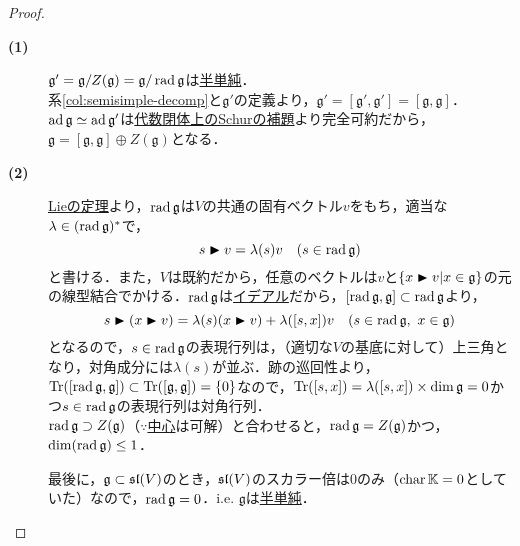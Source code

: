 \documentclass[rep_main]{subfiles}
\begin{document}
\begin{proof}
	\begin{description}
		\item[\textbf{(1)}] $\mathfrak{g}' = \mathfrak{g} / Z(\mathfrak{g}) = \mathfrak{g} / \operatorname{rad}\mathfrak{g}$は\hyperref[def:semisimple-LieAlg]{半単純}．\\
		系\ref{col:semisimple-decomp}と$\mathfrak{g}'$の定義より，$\mathfrak{g}' = [\mathfrak{g}', \mathfrak{g}'] = [\mathfrak{g}, \mathfrak{g}]$．\\
		$\operatorname{ad}\mathfrak{g} \simeq \operatorname{ad} \mathfrak{g}'$は\hyperref[col:Schur-closed]{代数閉体上のSchurの補題}より完全可約だから，$\mathfrak{g} = [\mathfrak{g}, \mathfrak{g}] \oplus Z(\mathfrak{g})$となる．
		\item[\textbf{(2)}] \hyperref[thm:eigen-Lie]{Lieの定理}より，$\operatorname{rad}\mathfrak{g}$は$V$の共通の固有ベクトル$v$をもち，適当な$\lambda \in (\operatorname{rad}\mathfrak{g})^*$で，
		\begin{equation}
			s \blacktriangleright v = \lambda(s)v\quad  (s \in \operatorname{rad}\mathfrak{g})
		\end{equation}
		と書ける．また，$V$は既約だから，任意のベクトルは$v$と$\{x \blacktriangleright v | x \in \mathfrak{g}\}$の元の線型結合でかける．$\operatorname{rad}\mathfrak{g}$は\hyperref[def:ideal-LieAlg]{イデアル}だから，$[\operatorname{rad}\mathfrak{g}, \mathfrak{g}] \subset \operatorname{rad}\mathfrak{g}$より，
		\begin{equation}
			\label{eq:rad-Lie-alg}
			s \blacktriangleright(x \blacktriangleright v) = \lambda(s)(x \blacktriangleright v) + \lambda([s, x])v\quad  (s \in \operatorname{rad}\mathfrak{g},\ x \in \mathfrak{g})
		\end{equation}
		となるので，$s \in \operatorname{rad}\mathfrak{g}$の表現行列は，（適切な$V$の基底に対して）上三角となり，対角成分には$\lambda(s)$が並ぶ．跡の巡回性より，$\Tr([\operatorname{rad}\mathfrak{g}, \mathfrak{g}]) \subset \Tr([\mathfrak{g}, \mathfrak{g}]) = \{0\}$なので，$\Tr([s, x]) = \lambda([s, x]) \times \dim\mathfrak{g}  = 0$かつ$s \in \operatorname{rad}\mathfrak{g}$の表現行列は対角行列．\\
		$\operatorname{rad}\mathfrak{g} \supset Z(\mathfrak{g}) $（$\because$\hyperref[def:center-LieAlg]{中心}は可解）と合わせると，$\operatorname{rad}\mathfrak{g} = Z(\mathfrak{g})$かつ，$\dim(\operatorname{rad}\mathfrak{g}) \leq 1$．
		
		最後に，$\mathfrak{g} \subset \mathfrak{sl}(V)$のとき，$\mathfrak{sl}(V)$のスカラー倍は$0$のみ（$\operatorname{char}\mathbb{K} = 0$としていた）なので，$\operatorname{rad}\mathfrak{g} = 0$．i.e. $\mathfrak{g}$は\hyperref[def:semisimple-LieAlg]{半単純}．
	\end{description}
\end{proof}
\end{document}
